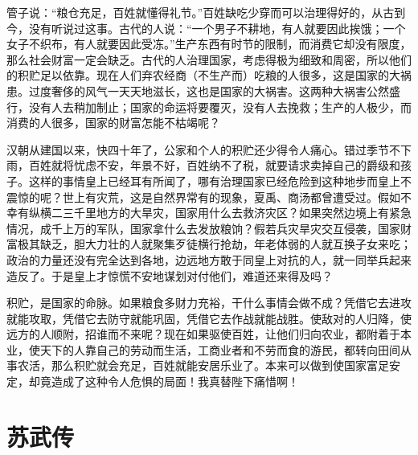 \documentclass[12pt,UTF-8,openany]{ctexbook}
\begin{document}
\begin{normalsize}
    
    管子说：“粮仓充足，百姓就懂得礼节。”百姓缺吃少穿而可以治理得好的，从古到今，没有听说过这事。古代的人说：“一个男子不耕地，有人就要因此挨饿；一个女子不织布，有人就要因此受冻。”生产东西有时节的限制，而消费它却没有限度，那么社会财富一定会缺乏。古代的人治理国家，考虑得极为细致和周密，所以他们的积贮足以依靠。现在人们弃农经商（不生产而）吃粮的人很多，这是国家的大祸患。过度奢侈的风气一天天地滋长，这也是国家的大祸害。这两种大祸害公然盛行，没有人去稍加制止；国家的命运将要覆灭，没有人去挽救；生产的人极少，而消费的人很多，国家的财富怎能不枯竭呢？
    
    汉朝从建国以来，快四十年了，公家和个人的积贮还少得令人痛心。错过季节不下雨，百姓就将忧虑不安，年景不好，百姓纳不了税，就要请求卖掉自己的爵级和孩子。这样的事情皇上已经耳有所闻了，哪有治理国家已经危险到这种地步而皇上不震惊的呢？世上有灾荒，这是自然界常有的现象，夏禹、商汤都曾遭受过。假如不幸有纵横二三千里地方的大旱灾，国家用什么去救济灾区？如果突然边境上有紧急情况，成千上万的军队，国家拿什么去发放粮饷？假若兵灾旱灾交互侵袭，国家财富极其缺乏，胆大力壮的人就聚集歹徒横行抢劫，年老体弱的人就互换子女来吃；政治的力量还没有完全达到各地，边远地方敢于同皇上对抗的人，就一同举兵起来造反了。于是皇上才惊慌不安地谋划对付他们，难道还来得及吗？
    
    积贮，是国家的命脉。如果粮食多财力充裕，干什么事情会做不成？凭借它去进攻就能攻取，凭借它去防守就能巩固，凭借它去作战就能战胜。使敌对的人归降，使远方的人顺附，招谁而不来呢？现在如果驱使百姓，让他们归向农业，都附着于本业，使天下的人靠自己的劳动而生活，工商业者和不劳而食的游民，都转向田间从事农活，那么积贮就会充足，百姓就能安居乐业了。本来可以做到使国家富足安定，却竟造成了这种令人危惧的局面！我真替陛下痛惜啊！
    
\end{normalsize}



\chapter{苏武传}
\end{document}
